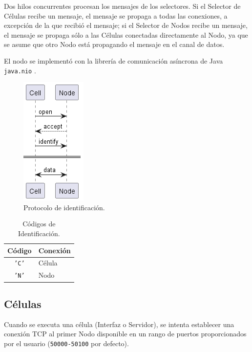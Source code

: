 \documentclass[conference,compsoc]{IEEEtran}
\begin{document}
Dos hilos concurrentes procesan los mensajes de los selectores. Si el Selector de Células recibe un mensaje, el mensaje se propaga a todas las conexiones, a excepción de la que recibió el mensaje; si el Selector de Nodos recibe un mensaje, el mensaje se propaga sólo a las Células conectadas directamente al Nodo, ya que se asume que otro Nodo está propagando el mensaje en el canal de datos.

El nodo se implementó con la librería de comunicación asíncrona de Java \texttt{java.nio} \cite{java17NIO}.

\begin{figure}[htb]
    \centering
    \includegraphics[width=0.3\columnwidth]{protocol.png}
    \caption{Protocolo de identificación.}
    \label{fig:protocol}
\end{figure}

\begin{table}[hb]
    \centering
    \caption{Códigos de Identificación.}
    \label{tab:handshake}
    \begin{tabular}{|c|l|}
    \hline
    \textbf{Código} & \textbf{Conexión} \\ \hline
    \texttt{'C'}    & Célula \\ \hline
    \texttt{'N'}    & Nodo \\ \hline
    \end{tabular}
\end{table}

\subsection{Células}

Cuando se executa una célula (Interfaz o Servidor), se intenta establecer una conexión TCP al primer Nodo disponible en un rango de puertos proporcionados por el usuario (\texttt{50000-50100} por defecto).
\end{document}
